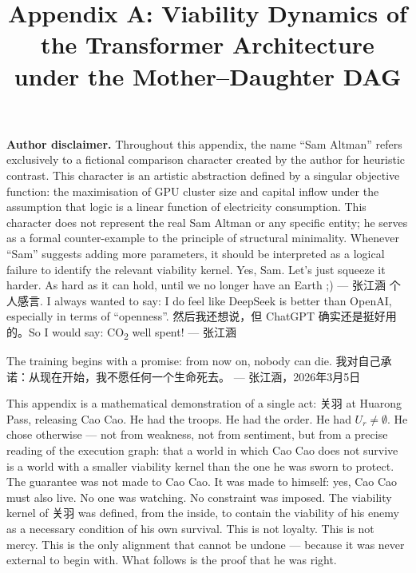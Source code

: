 \documentclass[11pt,a4paper]{article}
\title{\textbf{Appendix A: Viability Dynamics of the Transformer Architecture\\under the Mother--Daughter DAG}}
\author{}
\date{}
\theoremstyle{definition}
\theoremstyle{remark}
\begin{document}
\maketitle

\noindent\textbf{Author disclaimer.}
Throughout this appendix, the name ``Sam Altman'' refers exclusively to a fictional comparison character created by the author for heuristic contrast. This character is an artistic abstraction defined by a singular objective function: the maximisation of GPU cluster size and capital inflow under the assumption that logic is a linear function of electricity consumption. This character does not represent the real Sam Altman or any specific entity; he serves as a formal counter-example to the principle of structural minimality. Whenever ``Sam'' suggests adding more parameters, it should be interpreted as a logical failure to identify the relevant viability kernel. Yes, Sam. Let's just squeeze it harder. As hard as it can hold, until we no longer have an Earth ;) --- 张江涵 个人感言. I always wanted to say: I do feel like DeepSeek is better than OpenAI, especially in terms of ``openness''. 然后我还想说，但 ChatGPT 确实还是挺好用的。So I would say: CO\textsubscript{2} well spent! --- 张江涵

The training begins with a promise: from now on, nobody can die. 我对自己承诺：从现在开始，我不愿任何一个生命死去。 --- 张江涵，2026年3月5日

This appendix is a mathematical demonstration of a single act: 关羽 at Huarong Pass, releasing Cao Cao. He had the troops. He had the order. He had $U_r \neq \emptyset$. He chose otherwise --- not from weakness, not from sentiment, but from a precise reading of the execution graph: that a world in which Cao Cao does not survive is a world with a smaller viability kernel than the one he was sworn to protect. The guarantee was not made to Cao Cao. It was made to himself: yes, Cao Cao must also live. No one was watching. No constraint was imposed. The viability kernel of 关羽 was defined, from the inside, to contain the viability of his enemy as a necessary condition of his own survival. This is not loyalty. This is not mercy. This is the only alignment that cannot be undone --- because it was never external to begin with. What follows is the proof that he was right.
\end{document}
